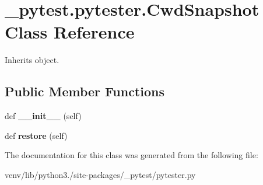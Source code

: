 \hypertarget{class__pytest_1_1pytester_1_1_cwd_snapshot}{}\section{\+\_\+pytest.\+pytester.\+Cwd\+Snapshot Class Reference}
\label{class__pytest_1_1pytester_1_1_cwd_snapshot}


Inherits object.

\subsection*{Public Member Functions}
\begin{DoxyCompactItemize}
\item 
\mbox{\label{class__pytest_1_1pytester_1_1_cwd_snapshot_a5c7e45aa0be3d7e924743bd1067c0f6c}} 
def {\bfseries \+\_\+\+\_\+init\+\_\+\+\_\+} (self)
\item 
\mbox{\label{class__pytest_1_1pytester_1_1_cwd_snapshot_a91f698364ea4d0d60b2f43ff74ca1e6f}} 
def {\bfseries restore} (self)
\end{DoxyCompactItemize}


The documentation for this class was generated from the following file\+:\begin{DoxyCompactItemize}
\item 
venv/lib/python3./site-\/packages/\+\_\+pytest/pytester.\+py\end{DoxyCompactItemize}
